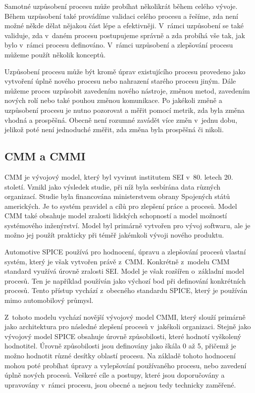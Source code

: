 \documentclass[czech,master]{diploma}
\begin{document}
Samotné uzpůsobení procesu může probíhat několikrát během celého vývoje. Během uzpůsobení také provádíme validaci celého procesu a řešíme, zda není možné někde dělat nějakou část lépe a efektivněji. V~rámci uzpůsobení se také validuje, zda v~daném procesu postupujeme správně a zda probíhá vše tak, jak bylo v~rámci procesu definováno. V~rámci uzpůsobení a zlepšování procesu můžeme použít několik konceptů.

Uzpůsobení procesu může být kromě úprav existujícího procesu provedeno jako vytvoření úplně nového procesu nebo nahrazení starého procesu jiným. Dále můžeme proces uzpůsobit zavedením nového nástroje, změnou metod, zavedením nových rolí nebo také pouhou změnou komunikace. Po jakékoli změně a uzpůsobení procesu je nutno pozorovat a měřit pomocí metrik, zda byla změna vhodná a prospěšná. Obecně není rozumné zavádět více změn v~jednu dobu, jelikož poté není jednoduché změřit, zda změna byla prospěšná či nikoli.

\subsection{CMM a CMMI}
CMM je vývojový model, který byl vyvinut institutem SEI v~80. letech 20. století. Vznikl jako výsledek studie, při níž byla sesbírána data různých organizací. Studie byla financována ministerstvem obrany Spojených států amerických. Je to systém pravidel a cílů pro zlepšení práce a procesů. Model CMM také obsahuje model zralosti lidských schopností a model možností systémového inženýrství. Model byl primárně vytvořen pro vývoj softwaru, ale je možno jej použít prakticky  při téměř jakémkoli vývoji nového produktu. \cite{ref:cmm_cmmi}

Automotive SPICE používá pro hodnocení, úpravu a zlepšování procesů vlastní systém, který je však vytvořen právě z~CMM. Konkrétně z~modelu CMM standard využívá úrovně zralosti SEI. Model je však rozšířen o~základní model procesů. Ten je například používán jako výchozí bod při definování konkrétních procesů. Tento přístup vychází z~obecného standardu SPICE, který je používán mimo automobilový průmysl.

Z~tohoto modelu vychází novější vývojový model CMMI, který slouží primárně jako architektura pro následné zlepšení procesů v~jakékoli organizaci. Stejně jako vývojový model SPICE obsahuje úrovně způsobilosti, které hodnotí vyškolený hodnotitel. Úrovně způsobilosti jsou definovány jako škála 0 až 5, přičemž je možno hodnotit různé desítky oblastí procesu. Na základě tohoto hodnocení mohou poté probíhat úpravy a vylepšování používaného procesu, nebo zavedení úplně nových procesů. Veškeré cíle a postupy, které jsou doporučovány a upravovány v~rámci procesu, jsou obecné a nejsou tedy technicky zaměřené.
\end{document}

